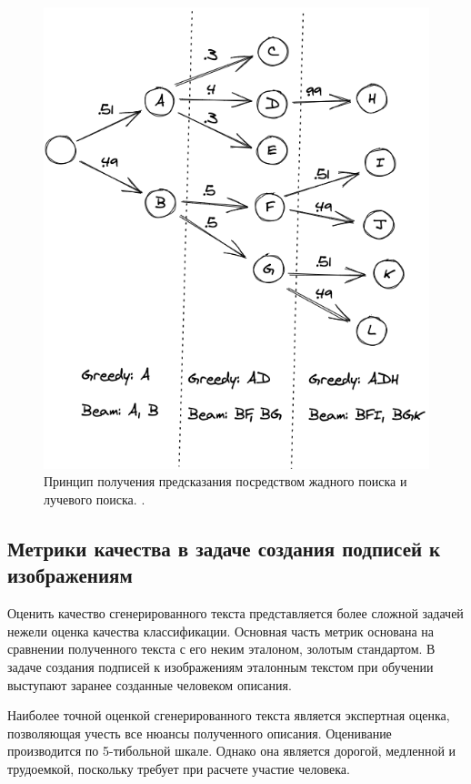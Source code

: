 \documentclass[a4paper,12pt]{extarticle}
\begin{document}
\begin{figure}[ht]
	\centering
	\includegraphics[scale=0.4]{beamsearch_vs_greedsearch.png}
	\caption{Принцип получения предсказания посредством жадного поиска и лучевого поиска.  \cite{https://vitalflux.com/greedy-search-vs-beam-search-decoding-concepts-examples/}.}
	\label{fig:beamsearch_vs_greedsearch}
\end{figure}

\subsection{Метрики качества в задаче создания подписей к изображениям}

Оценить качество сгенерированного текста представляется более сложной задачей нежели оценка качества классификации. Основная часть метрик основана на сравнении полученного текста с его неким эталоном, золотым стандартом. В задаче создания подписей к изображениям эталонным текстом при обучении выступают заранее созданные человеком описания.

Наиболее точной оценкой сгенерированного текста является экспертная оценка, позволяющая учесть все нюансы полученного описания. Оценивание производится по 5-тибольной шкале. Однако она является дорогой, медленной и трудоемкой, поскольку требует при расчете участие человека.
\end{document}
